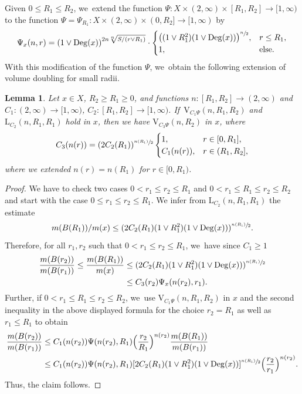 \documentclass[JEP,XML,SOM,Unicode,published]{cedram}
\newcommand{\rV}{\mathrm{V}}
\newcommand{\rL}{\mathrm{L}}
\theoremstyle{plain}
\newtheorem{lemma}[theorem]{Lemma}
\theoremstyle{definition}
\DeclareMathOperator{\Deg}{Deg}
\begin{document}
Given $0\leq R_1\leq R_2$, we~extend the function
$\Psi\colon X\times (2,\infty)\times [R_1,R_2]\to[1,\infty)$ to the function $\Psi=\Psi_{R_1}\colon X\times (2,\infty)\times(0,R_2]\to[1,\infty)$ by
\[
\Psi_x(n,r)
=\left(1\vee\Deg(x)\right)^{{2}n\sqrt[n]{S/(r\vee R_1)}}
\cdot\begin{cases}
\bigl((1\vee R_1^{2})(1\vee\Deg(x))\bigr)^{\sfrac{n}{2}},& r\leq R_1,
\\
1,& \text{else.}
\end{cases}
\]
With this modification of the function {$\Psi$}, we~obtain the following extension of volume doubling for small radii.
\begin{lemma}\label{lem:fulldoubling}
Let $x\in X$, $R_2\geq R_1\geq 0$, and functions $n:[R_{1},R_{2}]\to (2,\infty)$ and {$ C_1\colon (2,\infty)\to[1,\infty)$, $C_2\colon [R_1,R_2]\to[1,\infty) $}. If~$\rV_{C_1\Psi}(n,R_1,R_2) $ and {$\rL_{C_2}(n,R_1,R_1)$} hold in $x$, then we have $\rV_{C_3\Psi}(n,R_2)$ in $x$, where
\[
C_3(n(r))=(2C_2(R_1))^{\sfrac{n(R_1)}2}
\begin{cases}
1,& r\in[0,R_1],
\\
C_1(n(r)),& r\in(R_1,R_2],
\end{cases}
\]
where we extended $ n(r)=n(R_{1}) $ for $ r\in [0,R_{1}) $.
\end{lemma}
\begin{proof}
We have to check two cases $0<r_1\leq r_2\leq R_1$ and $0< r_1\leq R_1\leq r_2\leq R_2$ and start with the case $0\leq r_1\leq r_2\leq R_1$.
We infer from {$\rL_{C_2}(n,R_1,R_1)$} the estimate
\[
m(B(R_1))/{m(x)}\leq (2C_2(R_1)(1\vee R_1^2)(1\vee \Deg(x)))^{\sfrac{n(R_1)}{2}}.
\]
Therefore, for all $r_1,r_2$ such that $0< r_1\leq r_2\leq R_1$, we~have {since $C_1\ge 1$}
\begin{align*}
\frac{m(B(r_2))}{m(B(r_1))}\leq \frac{m(B(R_1))}{m(x)}&\leq
(2C_2(R_1)(1\vee R_{1}^{2})(1\vee\Deg(x)))^{\sfrac{n(R_1)}{2}}\\
&\leq C_3(r_2)\Psi_{x}(n(r_2),r_1).
\end{align*}
Further, if $0<r_1\leq R_1\leq r_2\leq R_2$, we~use $\rV_{C_1{\Psi}}(n,R_1,R_2)$ in $x$ and the second inequality in the above displayed formula for the choice $r_2=R_1$ as well as $r_1\leq R_1$ to obtain
\begin{align*}
\frac{m(B(r_2))}{m(B(r_1))}
&\leq
C_{1}(n(r_2)){\Psi}(n(r_2),R_1)\Bigl(\frac{r_2}{R_1}\Bigr)^{n(r_2)}\frac{m(B(R_1))}{m(B(r_1))}
\\
&\leq
C_{1}(n(r_2))\Psi(n(r_2),R_1)[2C_2(R_1)(1\vee R_1^2)(1\vee\Deg(x))]^{\sfrac{n(R_1)}{2}}\Bigl(\frac{r_2}{r_1}\Bigr)^{n(r_2)}.
\end{align*}
Thus, the claim follows.
\end{proof}
\end{document}
